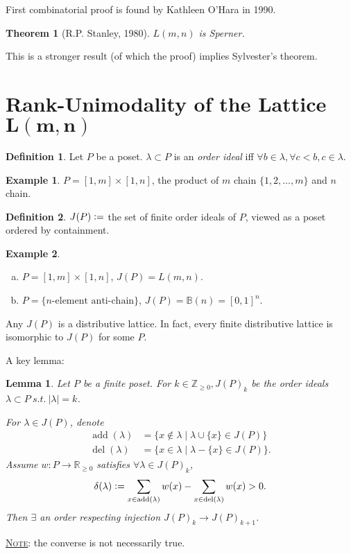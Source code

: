 \documentclass{report}
\newcommand{\R}{\mathbb{R}}
\newcommand{\Z}{\mathbb{Z}}
\newcommand{\st}{\ s.t.\ }
\def \del {\operatorname{del}}
\def \add {\operatorname{add}}
\newcommand{\defeq}{\vcentcolon=}
\newcommand{\fancyem}[1]{\underline{\textsc{#1}}}
\newtheorem{theorem}{Theorem}[section]
\newtheorem{lemma}{Lemma}[section]
\theoremstyle{definition}
\newtheorem{definition}{Definition}[section]
\newtheorem{example}{Example}[section]
\theoremstyle{remark}
\numberwithin{equation}{section}
\newcommand*\ttlmath[2]{\texorpdfstring{$\boldsymbol{#1}$}{#2}}
\begin{document}
First combinatorial proof is found by Kathleen O'Hara in 1990.

\begin{theorem}[R.P. Stanley, 1980]
    $L(m, n)$ is Sperner.
\end{theorem}
This is a stronger result (of which the proof) implies Sylvester's theorem.

\section{Rank-Unimodality of the Lattice \ttlmath{L(m, n)}{L(m, n)}}
\begin{definition}
    Let $P$ be a poset. $\lambda \subset P$ is an \emph{order ideal} iff $\forall b \in \lambda, \forall c < b, c \in \lambda$.
\end{definition}
\begin{example}
    $P = [1, m] \times [1, n]$, the product of $m$ chain $\{1, 2, \ldots, m\}$ and $n$ chain.
\end{example}

\begin{definition}
    $J(P) \defeq$ the set of finite order ideals of $P$, viewed as a poset ordered by containment.
\end{definition}
\begin{example}
    \begin{enumerate}[(a)]
        \item $P = [1, m] \times [1, n]$, $J(P) = L(m, n)$.
        \item $P = \{\text{$n$-element anti-chain}\}$, $J(P) = \mathbb{B}(n) = [0, 1]^n$.
    \end{enumerate}
\end{example}

Any $J(P)$ is a distributive lattice. In fact, every finite distributive lattice is isomorphic to $J(P)$ for some $P$.

A key lemma:
\begin{lemma}
    Let $P$ be a finite poset. For $k \in \Z_{\geq 0}, J(P)_k$ be the order ideals $\lambda \subset P \st |\lambda| = k$.

    For $\lambda \in J(P)$, denote \begin{align*}
        \add(\lambda) & = \{x \notin \lambda \mid \lambda \cup \{x\} \in J(P)\} \\
        \del(\lambda) & = \{x \in \lambda \mid \lambda - \{x\} \in J(P)\}.
    \end{align*}
    Assume $w: P \to \R_{\geq 0}$ satisfies $\forall \lambda \in J(P)_k$, \[
        \delta(\lambda) \defeq \sum_{x \in \add(\lambda)} w(x) - \sum_{x \in \del(\lambda)}w(x) > 0.    
    \]
    Then $\exists$ an order respecting injection $J(P)_k \to J(P)_{k+1}$.
\end{lemma}
\fancyem{Note}: the converse is not necessarily true.
\end{document}
